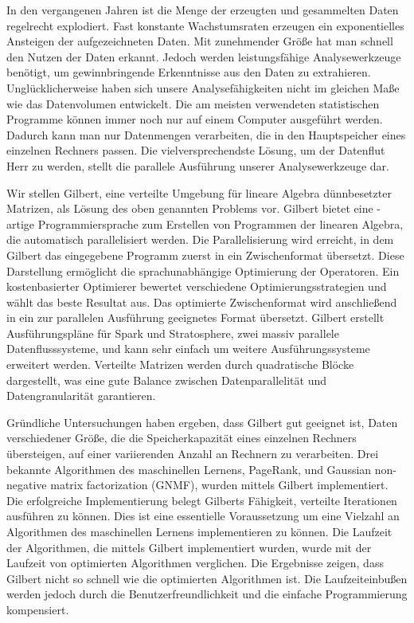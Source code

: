\clearemptydoublepage
{}
{}	

\vspace*{2cm}
\begin{center}
\end{center}
\vspace{1cm}

In den vergangenen Jahren ist die Menge der erzeugten und gesammelten Daten regelrecht explodiert.
Fast konstante Wachstumsraten erzeugen ein exponentielles Ansteigen der aufgezeichneten Daten.
Mit zunehmender Größe hat man schnell den Nutzen der Daten er\-kannt.
Jedoch werden leistungsfähige Analysewerkzeuge benötigt, um gewinnbringende Er\-kennt\-nis\-se aus den Daten zu extrahieren.
Unglücklicherweise haben sich unsere Analyse\-fä\-hig\-kei\-ten nicht im gleichen Maße wie das Datenvolumen entwickelt.
Die am meisten verwendeten statistischen Programme können immer noch nur auf einem Computer ausgeführt werden.
Dadurch kann man nur Datenmengen verarbeiten, die in den Hauptspeicher eines einzelnen Rechners passen.
Die vielversprechendste Lösung, um der Datenflut Herr zu werden, stellt die parallele Ausführung unserer Analysewerkzeuge dar.

Wir stellen Gilbert, eine verteilte Umgebung für lineare Algebra dünnbesetzter Matrizen, als Lösung des oben genannten Problems vor.
Gilbert bietet eine \matlab-artige Programmiersprache zum Erstellen von Programmen der linearen Algebra, die automatisch parallelisiert werden.
Die Parallelisierung wird erreicht, in dem Gilbert das eingegebene Programm zuerst in ein Zwischenformat übersetzt.
Diese Darstellung ermöglicht die sprachunabhängige Optimierung der Operatoren.
Ein kostenbasierter Optimierer bewertet verschiedene Optimierungs\-strategien und wählt das beste Resultat aus.
Das optimierte Zwischenformat wird anschließend in ein zur parallelen Ausführung geeignetes Format übersetzt.
Gilbert erstellt Ausführungs\-pläne für Spark und Stratosphere, zwei massiv parallele Datenflusssysteme, und kann sehr einfach um weitere Ausführungssysteme erweitert werden. 
Verteilte Matrizen werden durch quadratische Blöcke dargestellt, was eine gute Balance zwischen Datenparallelität und Datengranularität garantieren.

Gründliche Untersuchungen haben ergeben, dass Gilbert gut geeignet ist, Daten ver\-schie\-de\-ner Größe, die die Speicherkapazität eines einzelnen Rechners übersteigen, auf einer variierenden Anzahl an Rechnern zu verarbeiten.
Drei bekannte Algorithmen des maschinellen Lernens, PageRank, \kmeans und Gaussian non-negative matrix factorization (GNMF), wurden mittels Gilbert implementiert.
Die erfolgreiche Implementierung belegt Gilberts Fähigkeit, verteilte Iterationen ausführen zu können.
Dies ist eine essentielle Voraussetzung um eine Vielzahl an Algorithmen des maschinellen Lernens implementieren zu können.
Die Laufzeit der Algorithmen, die mittels Gilbert implementiert wurden, wurde mit der Laufzeit von optimierten Algorithmen verglichen.
Die Ergebnisse zeigen, dass Gilbert nicht so schnell wie die optimierten Algorithmen ist.
Die Laufzeiteinbußen werden jedoch durch die Benutzerfreundlichkeit und die einfache Programmierung kompensiert.
